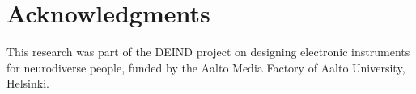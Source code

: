 \documentclass{acm_proc_article-sp}
\begin{document}



\section{Acknowledgments}
This research was part of the DEIND project on designing electronic instruments for neurodiverse people, funded by the Aalto Media Factory of Aalto University, Helsinki.  


~\nocite{cappelen2012-mus,herstad2012-wha,herstad2012-mak,green2011agility,kleimola2011-vec,kleimola2010-fee,parker2011-a-s,parker2010-mod,valimaki2010-par,straus2011-ext,hegarty2006-noi,gurevich2007expression,burrows2010choreographer,bown2009understanding,jaarsma2012autism,hammel2011teaching,fard2012-wit,baggs2007-in,sinclair1993-don,wishart1994-aud,headlam2006-lea,2006-sou,campo2009-microsound,campo2009-the,m.-baalman2009-the,campo2008-objMod,wcd2011-scbook}



 
\balancecolumns
\end{document}
